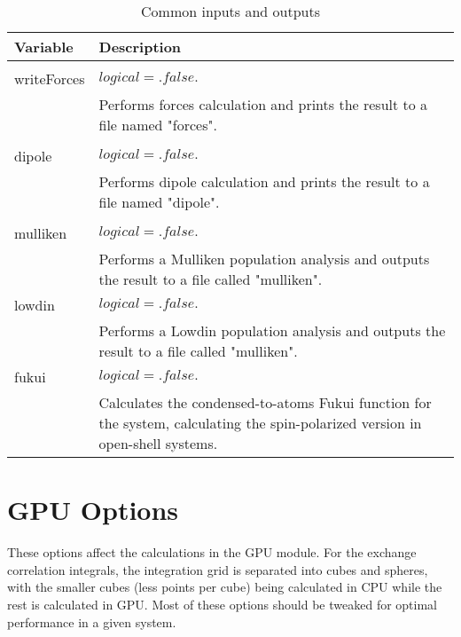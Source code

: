 \begin{Spacing}{1.0}
   \begin{longtable}{ p{} p{} }
   
      \toprule
      \textbf{Variable} & Description \\*
      \midrule \\*
      \endhead
   
      \bottomrule
      \caption{Common inputs and outputs}
      \endfoot

      writeForces  & $ logical = .false. $ \\
      & Performs forces calculation and prints the result to a file named
      "forces". \\
      \\
      dipole & $ logical = .false. $ \\
      & Performs dipole calculation and prints the result to a file named
      "dipole". \\
      \\
      mulliken & $ logical = .false. $ \\
      & Performs a Mulliken population analysis and outputs the result to
      a file called "mulliken".\\
      lowdin & $ logical = .false. $ \\
      & Performs a Lowdin population analysis and outputs the result to
      a file called "mulliken".\\
      fukui & $ logical = .false. $ \\
      & Calculates the condensed-to-atoms Fukui function for the system, 
      calculating the spin-polarized version in open-shell systems.\\
   \end{longtable}
\end{Spacing}

\section{GPU Options}

These options affect the calculations in the GPU module. For the exchange
correlation integrals, the integration grid is separated into cubes and spheres,
with the smaller cubes (less points per cube) being calculated in CPU while the
rest is calculated in GPU. Most of these options should be tweaked for optimal
performance in a given system.

